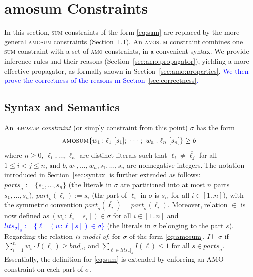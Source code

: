 \documentclass[preprint,authoryear]{elsarticle}
\theoremstyle{definition}
\def\amosum{\ensuremath{\textsc{amosum}}\xspace}
\begin{document}
\section{{\sc amosum} Constraints}

\label{sec:amosum}

In this section, \textsc{sum} constraints of the form \eqref{eq:sum} are replaced by the more general \textsc{amosum} constraints (Section~\ref{sec:amo:syntax}).
An \textsc{amosum} constraint combines one \textsc{sum} constraint with a set of \textsc{amo} constraints, in a convenient syntax.
We provide inference rules and their reasons (Section~\ref{sec:amo:propagator}), yielding a more effective propagator, as formally shown in Section~\ref{sec:amo:properties}. \textcolor{blue}{We then prove the correctness of the reasons in Section~\ref{sec:correctness}.}  


\subsection{Syntax and Semantics}\label{sec:amo:syntax}

An \emph{\textsc{amosum} constraint} (or simply constraint from this point) $\sigma$ has the form
\begin{align}\label{eq:amosum}
    \amosum\{w_1 : \ell_1\ [s_1];\ \cdots;\ w_n : \ell_n\ [s_n]\} \geq b
\end{align}
where $n \geq 0$, $\ell_1,\ldots,\ell_n$ are distinct literals such that $\ell_i \neq \overline{\ell_j}$ for all $1 \leq i < j \leq n$,
and $b,w_1,\ldots,w_n,s_1,\ldots,s_n$ are nonnegative integers.
%
The notation introduced in Section~\ref{sec:syntax} is further extended as follows:
$\mathit{parts}_\sigma := \{s_1, \ldots, s_n\}$ (the literals in $\sigma$ are partitioned into at most $n$ parts $s_1,\ldots,s_n$),
$\mathit{part}_\sigma(\ell_i) := s_i$ (the part of $\ell_i$ in $\sigma$ is $s_i$, for all $i \in [1..n]$), with the symmetric convention $\mathit{part}_\sigma(\overline{\ell_i})=\mathit{part}_\sigma(\ell_i)$.
Moreover, relation ${}\in{}$ is now defined as $(w_i : \ell_i\ [s_i]) \in \sigma$ for all $i \in [1..n]$ and \textcolor{blue}{$\mathit{lits}_\sigma|_s := \{\ell \mid (w:\ell [s]) \in \sigma\}$} (the literals in $\sigma$ belonging to the part $s$).
%
Regarding the relation \emph{is model of}, for $\sigma$ of the form \eqref{eq:amosum}, $I \models \sigma$ if 
$\sum_{i = 1}^{n}{w_i \cdot I(\ell_i)} \geq \mathit{bnd}_\sigma$, and 
$\sum_{\ell \in \mathit{lits}_\sigma|_s}{I(\ell)} \leq 1$ for all $s \in \mathit{parts}_\sigma$.
Essentially, the definition for \eqref{eq:sum} is extended by enforcing an AMO constraint on each part of $\sigma$.
\end{document}
